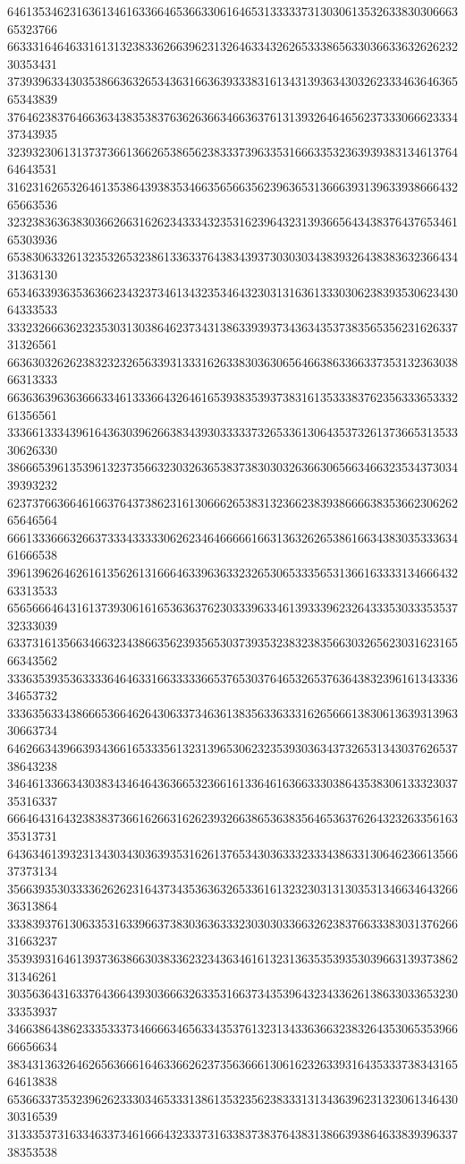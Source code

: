 64613534623163613461633664653663306164653133333731303061353263383030666365323766
66333164646331613132383362663962313264633432626533386563303663363262623230353431
37393963343035386636326534363166363933383161343139363430326233346364636565343839
37646238376466363438353837636263663466363761313932646465623733306662333437343935
32393230613137373661366265386562383337396335316663353236393938313461376464643531
31623162653264613538643938353466356566356239636531366639313963393866643265663536
32323836363830366266316262343334323531623964323139366564343837643765346165303936
65383063326132353265323861336337643834393730303034383932643838363236643431363130
65346339363536366234323734613432353464323031316361333030623839353062343064333533
33323266636232353031303864623734313863393937343634353738356535623162633731326561
66363032626238323232656339313331626338303630656466386336633735313236303866313333
66363639636366633461333664326461653938353937383161353338376235633365333261356561
33366133343961643630396266383439303333373265336130643537326137366531353330626330
38666539613539613237356632303263653837383030326366306566346632353437303439393232
62373766366461663764373862316130666265383132366238393866663835366230626265646564
66613336663266373334333330626234646666616631363262653861663438303533363461666538
39613962646261613562613166646339636332326530653335653136616333313466643263313533
65656664643161373930616165363637623033396334613933396232643335303335353732333039
63373161356634663234386635623935653037393532383238356630326562303162316566343562
33363539353633336464633166333336653765303764653265376364383239616134333634653732
33363563343866653664626430633734636138356336333162656661383061363931396330663734
64626634396639343661653335613231396530623235393036343732653134303762653738643238
34646133663430383434646436366532366161336461636633303864353830613332303735316337
66646431643238383736616266316262393266386536383564653637626432326335616335313731
64363461393231343034303639353162613765343036333233343863313064623661356637373134
35663935303333626262316437343536363265336161323230313130353134663464326636313864
33383937613063353163396637383036363332303030336632623837663338303137626631663237
35393931646139373638663038336232343634616132313635353935303966313937386231346261
30356364316337643664393036663263353166373435396432343362613863303365323033353937
34663864386233353337346666346563343537613231343363663238326435306535396666656634
38343136326462656366616463366262373563666130616232633931643533373834316564613838
65366337353239626233303465333138613532356238333131343639623132306134643030316539
31333537316334633734616664323337316338373837643831386639386463383939633738353538
